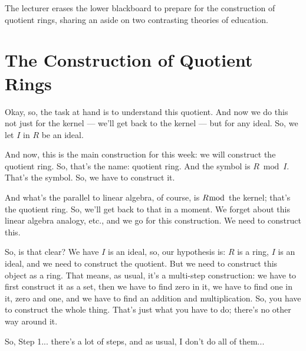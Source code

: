 \begin{note}
The lecturer erases the lower blackboard to prepare for the construction of quotient rings, sharing an aside on two contrasting theories of education.
\end{note}

\section{The Construction of Quotient Rings}

\begin{speech}[00:28:05 - 00:29:59]
Okay, so, the task at hand is to understand this quotient. And now we do this not just for the kernel --- we'll get back to the kernel --- but for any ideal. So, we let $I$ in $R$ be an ideal.  
 
And now, this is the main construction for this week: we will construct the quotient ring.  So, that's the name: quotient ring. And the symbol is $R \bmod I$.  That's the symbol. So, we have to construct it. 

And what's the parallel to linear algebra, of course, is $R \bmod$ the kernel; that's the quotient ring. So, we'll get back to that in a moment. We forget about this linear algebra analogy, etc., and we go for this construction. We need to construct this. 

So, is that clear? We have $I$ is an ideal, so, our hypothesis is: $R$ is a ring, $I$ is an ideal, and we need to construct the quotient. But we need to construct this object as a ring. That means, as usual, it's a multi-step construction: we have to first construct it as a set, then we have to find zero in it, we have to find one in it,  zero and one, and we have to find an addition and multiplication. So, you have to construct the whole thing. That's just what you have to do; there's no other way around it. 

So, Step 1... there's a lot of steps, and as usual, I don't do all of them... 
\end{speech}

